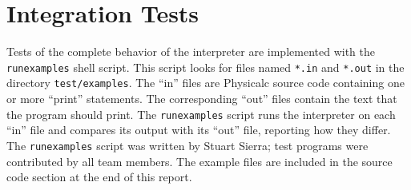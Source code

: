 \section{Integration Tests}

Tests of the complete behavior of the interpreter are implemented with
the \texttt{runexamples} shell script.  This script looks for files
named \texttt{*.in} and \texttt{*.out} in the directory
\texttt{test/examples}.  The ``in'' files are Physicalc source code
containing one or more ``print'' statements.  The corresponding
``out'' files contain the text that the program should print.  The
\texttt{runexamples} script runs the interpreter on each ``in'' file
and compares its output with its ``out'' file, reporting how they
differ.  The \texttt{runexamples} script was written by Stuart Sierra;
test programs were contributed by all team members.  The example files
are included in the source code section at the end of this report.
